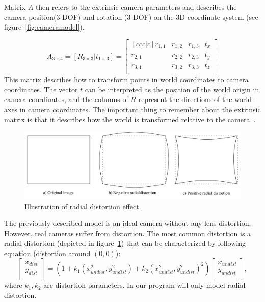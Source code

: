 Matrix $A$ then refers to the extrinsic camera parameters and describes the camera position(3 DOF) and rotation (3 DOF) on the 3D coordinate system (see figure~\ref{fig:cameramodel}).

\begin{equation}
	A_{3 \times 4} = [R_{3 \times 3} |t_{1 \times 3}] =
	\begin{bmatrix}[ccc|c]
		r_{1,1} & r_{1,2} & r_{1,3} & t_{x} \\
		r_{2,1} & r_{2,2} & r_{2,3} & t_{y} \\
		r_{3,1} & r_{3,2} & r_{3,3} & t_{z} \\
	\end{bmatrix}
\end{equation}
This matrix describes how to transform points in world coordinates to camera coordinates. The vector $t$ can be interpreted as the position of the world origin in camera coordinates, and the columns of $R$ represent the directions of the world-axes in camera coordinates. The important thing to remember about the extrinsic matrix is that it describes how the world is transformed relative to the camera~\cite{solem}.

\begin{figure}[!htbp]
	\begin{center}
		\includegraphics[keepaspectratio,width=\textwidth]{fig/distortion.pdf}
	\end{center}
	\caption{Illustration of radial distortion effect.}
	\label{fig:dist}
\end{figure}

The previously described model is an ideal camera without any lens distortion. However, real cameras suffer from distortion. The most common distortion is a radial distortion (depicted in figure~\ref{fig:dist}) that can be characterized by following equation (distortion around $(0,0)$):
\begin{equation}
	\begin{bmatrix}
		x_{dist} \\
		y_{dist} \\
	\end{bmatrix}
	= (1 + k_1(x^2_{undist}, y^2_{undist}) + k_2(x^2_{undist}, y^2_{undist})^2)
	\begin{bmatrix}
		x_{undist} \\
		y_{undist} \\
	\end{bmatrix},
	\label{distortion}
\end{equation}
where $k_1,k_2$ are distortion parameters. In our program will only model radial distortion.

